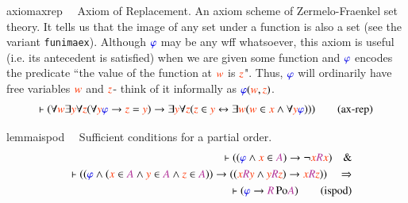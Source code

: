\begin{restatable}{axiom}{axrep}~~ Axiom of Replacement.  An axiom scheme of
Zermelo-Fraenkel set theory.  It tells us that the image of any
set
       under a function is also a set (see the variant {\tt funimaex}). 
Although
       $\mw{\varphi}$ may be any wff whatsoever, this axiom is useful (i.e.
its
       antecedent is satisfied) when we are given some function and
$\mw{\varphi}$
       encodes the predicate ``the value of the function at $\msc{w}$ is
$\msc{z}$".
       Thus, $\mw{\varphi}$ will ordinarily have free variables $\msc{w}$ and
$\msc{z}$- think
       of it informally as $\mw{\varphi} ( \msc{w} , \msc{z} )$.  
\begin{align}
\vdash ( \forall \msc{w} \exists \msc{y} \forall \msc{z} ( \forall \msc{y}
    \mw{\varphi} \rightarrow \msc{z} = \msc{y} ) \rightarrow \exists \msc{y}
    \forall \msc{z} ( \msc{z} \in \msc{y} \leftrightarrow \exists \msc{w} (
    \msc{w} \in \msc{x} \wedge \forall \msc{y} \mw{\varphi} ) )
    )\label{eq:ax-rep}\tag{ax-rep}
\end{align}
\end{restatable}

\dfid

\begin{restatable}{lemma}{ispod}~~ Sufficient conditions for a partial order. 
~
\begin{align}
\vdash ( ( \mw{\varphi} \wedge \msc{x} \in \mc{A} ) \rightarrow \lnot \msc{x}
    \mc{R} \msc{x} )\quad\& \notag \\
    \quad \vdash ( ( \mw{\varphi} \wedge ( \msc{x} \in
    \mc{A} \wedge \msc{y} \in \mc{A} \wedge \msc{z} \in \mc{A} ) ) \rightarrow
    ( ( \msc{x} \mc{R} \msc{y} \wedge \msc{y} \mc{R} \msc{z} ) \rightarrow
    \msc{x} \mc{R} \msc{z} ) )\quad\Rightarrow \notag \\
    \quad \vdash ( \mw{\varphi}
    \rightarrow \mc{R} \,\mathrm{Po} \mc{A} )\label{eq:ispod}\tag{ispod}
\end{align}
\end{restatable}

